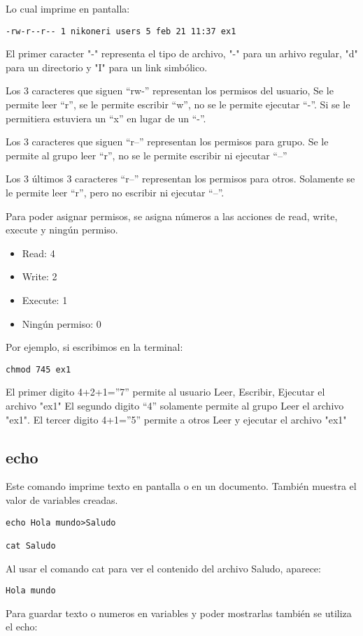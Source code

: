 \documentclass[a4paper]{article}
\begin{document}
Lo cual imprime en pantalla:
\begin{verbatim}
-rw-r--r-- 1 nikoneri users 5 feb 21 11:37 ex1
\end{verbatim}

El primer caracter "-" representa el tipo de archivo, "-" para un arhivo regular, "d" para un directorio y "I" para un link simbólico.

Los 3 caracteres que siguen “rw-” representan los permisos del usuario, Se le permite leer “r”, se le permite escribir “w”, no se le permite ejecutar “-”. Si se le permitiera estuviera un “x” en lugar de un “-”.

Los 3 caracteres que siguen “r--” representan los permisos para grupo. Se le permite al grupo leer “r”, no se le permite escribir ni ejecutar “--”

Los 3 últimos 3 caracteres “r--” representan los permisos para otros. Solamente se le permite leer “r”, pero no escribir ni ejecutar “--”.

Para poder asignar permisos, se asigna números  a las acciones de read, write, execute y ningún permiso.

\begin{itemize}
\item Read: 4
\item Write: 2
\item Execute: 1
\item Ningún permiso: 0
\end{itemize}

Por ejemplo, si escribimos en la terminal:

\begin{verbatim}
chmod 745 ex1
\end{verbatim}

El primer digito 4+2+1=”7” permite al usuario Leer, Escribir, Ejecutar el archivo "ex1"
El segundo digito “4” solamente permite al grupo Leer el archivo "ex1".
El tercer digito  4+1=”5” permite a otros Leer y ejecutar el archivo "ex1"

\subsection{echo}

Este comando imprime texto en pantalla o en un documento. También muestra el valor de variables creadas.
 \begin{verbatim}
echo Hola mundo>Saludo
 
cat Saludo
 \end{verbatim}
Al usar el comando cat para ver el contenido del archivo Saludo, aparece:
\begin{verbatim} 
Hola mundo
\end{verbatim}
Para guardar texto o numeros en variables y poder mostrarlas también se utiliza el echo:
\end{document}
